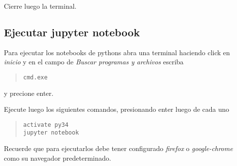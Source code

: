 \documentclass[hidelinks,12pt]{article}
\begin{document}
Cierre luego la terminal.

\subsection{Ejecutar jupyter notebook}
Para ejecutar los notebooks de pythons abra una terminal haciendo click en 
\emph{inicio} y en el campo de \emph{Buscar programas y archivos} escriba 
\begin{quote}
\begin{verbatim}
cmd.exe
\end{verbatim}
\end{quote}
y precione enter.

Ejecute luego los siguientes comandos, presionando enter luego de cada uno

\begin{quote}
\begin{verbatim}
activate py34
jupyter notebook
\end{verbatim}
\end{quote}

Recuerde que para ejecutarlos debe tener configurado \emph{firefox} o
\emph{google-chrome} como su navegador predeterminado.

\end{document}
